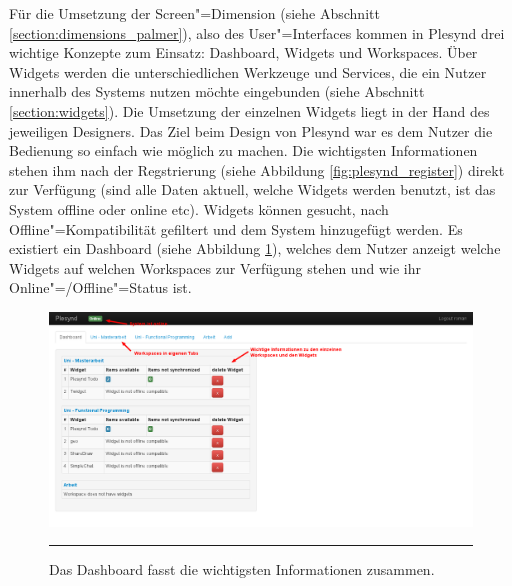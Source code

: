 Für die Umsetzung der Screen"=Dimension (siehe Abschnitt \ref{section:dimensions_palmer}), also des User"=Interfaces kommen in Plesynd drei wichtige Konzepte zum Einsatz: Dashboard, Widgets und Workspaces. Über Widgets werden die unterschiedlichen Werkzeuge und Services, die ein Nutzer innerhalb des Systems nutzen möchte eingebunden (siehe Abschnitt \ref{section:widgets}). Die Umsetzung der einzelnen Widgets liegt in der Hand des jeweiligen Designers. Das Ziel beim Design von Plesynd war es dem Nutzer die Bedienung so einfach wie möglich zu machen. Die wichtigsten Informationen stehen ihm nach der Regstrierung (siehe Abbildung \ref{fig:plesynd_register}) direkt zur Verfügung (sind alle Daten aktuell, welche Widgets werden benutzt, ist das System offline oder online etc). Widgets können gesucht, nach Offline"=Kompatibilität gefiltert und dem System hinzugefügt werden. Es existiert ein Dashboard (siehe Abbildung \ref{fig:plesynd_dashboard}), welches dem Nutzer anzeigt welche Widgets auf welchen Workspaces zur Verfügung stehen und wie ihr Online"=/Offline"=Status ist.
\begin{figure}
  \centering
  \includegraphics[width=\textwidth,height=\textheight,keepaspectratio]{./Figures/plesynd_dashboard.png}
    \rule{35em}{0.5pt}
  \caption[Plesynd User"=Interface: Dashboard]{Das Dashboard fasst die wichtigsten Informationen zusammen.}
  \label{fig:plesynd_dashboard}
\end{figure}

